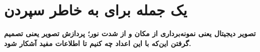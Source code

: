\documentclass[11pt,a4paper]{article}
\begin{document}
	
	\section*{یک جمله برای به خاطر سپردن}
	
	\begin{center}
		\Large
		\textbf{
			تصویر دیجیتال یعنی نمونه‌برداری از مکان و از شدت نور؛
			پردازش تصویر یعنی تصمیم گرفتن این‌که با این اعداد چه کنیم
			تا اطلاعات مفید آشکار شود.
		}
	\end{center}
	
\end{document}
